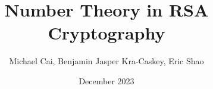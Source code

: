 \documentclass{article}
\title{Number Theory in RSA Cryptography}
\author{Michael Cai, Benjamin Jasper Kra-Caskey, Eric Shao}
\date{December 2023}
\begin{document}
\maketitle


\begin{comment}
\newpage
\section{Progress Report}

\subsection{Project Initiation and Completed Work}
The current status of the project is in the drafting stage. We have initiated the project and have been following our \textit{Project Prospectus} by first outlining the mathematical methods that we will use and following up with the method of how RSA Encryption works. This is followed by two sections with one being the benefits of RSA encryption and how it stops hackers from intercepting encoded messages and possible ways of breaking RSA encryption.

Currently, we have done the following: Number Theory Background and How RSA Works. These two sections consists of the necessary mathematical methods to discuss RSA encryption alongside the algorithms. For the number theory background, we discuss modular exponentiation, modular arithmetic, multiplicative inverses, and Euler's Totient theorem with proofs to them and how they work. Next, our section on RSA goes in depth on the process via four key steps: key generation, key distribution, encryption, and decryption. This covers the whole process from the development of the key to the end receiving of the message. We use two people to demonstrate this idea with Alice and Bob showcasing the power of RSA encryption.

Adding on, there are no deviations from the original $Project$ $Prospectus$. However, there is consideration in adding in external/extra material to showcase the power of RSA encryption via multiple examples. Thus, a section on examples of the use cases of RSA encryption is under consideration.

\end{comment}
\end{document}
